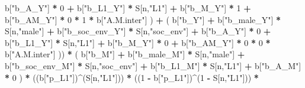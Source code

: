 \documentclass[
]{book}
\newenvironment{Shaded}{\begin{snugshade}}{\end{snugshade}}
\newcommand{\DecValTok}[1]{\textcolor[rgb]{0.00,0.00,0.81}{#1}}
\newcommand{\NormalTok}[1]{#1}
\newcommand{\SpecialCharTok}[1]{\textcolor[rgb]{0.81,0.36,0.00}{\textbf{#1}}}
\newcommand{\StringTok}[1]{\textcolor[rgb]{0.31,0.60,0.02}{#1}}
\begin{document}
\begin{Shaded}
\begin{Highlighting}[]
\NormalTok{                                 b[}\StringTok{"b\_A\_Y"}\NormalTok{] }\SpecialCharTok{*} \DecValTok{0} \SpecialCharTok{+} 
\NormalTok{                                 b[}\StringTok{"b\_L1\_Y"}\NormalTok{] }\SpecialCharTok{*}\NormalTok{ S[n,}\StringTok{"L1"}\NormalTok{] }\SpecialCharTok{+}
\NormalTok{                                 b[}\StringTok{"b\_M\_Y"}\NormalTok{] }\SpecialCharTok{*} \DecValTok{1} \SpecialCharTok{+}
\NormalTok{                                 b[}\StringTok{"b\_AM\_Y"}\NormalTok{] }\SpecialCharTok{*} \DecValTok{0} \SpecialCharTok{*} \DecValTok{1} \SpecialCharTok{*}\NormalTok{ b[}\StringTok{"A.M.inter"}\NormalTok{] ) }\SpecialCharTok{+} 
\NormalTok{                             ( b[}\StringTok{"b\_Y"}\NormalTok{] }\SpecialCharTok{+} 
\NormalTok{                                 b[}\StringTok{"b\_male\_Y"}\NormalTok{] }\SpecialCharTok{*}\NormalTok{ S[n,}\StringTok{"male"}\NormalTok{] }\SpecialCharTok{+} 
\NormalTok{                                 b[}\StringTok{"b\_soc\_env\_Y"}\NormalTok{] }\SpecialCharTok{*}\NormalTok{ S[n,}\StringTok{"soc\_env"}\NormalTok{] }\SpecialCharTok{+} 
\NormalTok{                                 b[}\StringTok{"b\_A\_Y"}\NormalTok{] }\SpecialCharTok{*} \DecValTok{0} \SpecialCharTok{+} 
\NormalTok{                                 b[}\StringTok{"b\_L1\_Y"}\NormalTok{] }\SpecialCharTok{*}\NormalTok{ S[n,}\StringTok{"L1"}\NormalTok{] }\SpecialCharTok{+}
\NormalTok{                                 b[}\StringTok{"b\_M\_Y"}\NormalTok{] }\SpecialCharTok{*} \DecValTok{0} \SpecialCharTok{+}
\NormalTok{                                 b[}\StringTok{"b\_AM\_Y"}\NormalTok{] }\SpecialCharTok{*} \DecValTok{0} \SpecialCharTok{*} \DecValTok{0} \SpecialCharTok{*}\NormalTok{ b[}\StringTok{"A.M.inter"}\NormalTok{] )) }\SpecialCharTok{*}
\NormalTok{      ( b[}\StringTok{"b\_M"}\NormalTok{] }\SpecialCharTok{+} 
\NormalTok{          b[}\StringTok{"b\_male\_M"}\NormalTok{] }\SpecialCharTok{*}\NormalTok{ S[n,}\StringTok{"male"}\NormalTok{] }\SpecialCharTok{+} 
\NormalTok{          b[}\StringTok{"b\_soc\_env\_M"}\NormalTok{] }\SpecialCharTok{*}\NormalTok{ S[n,}\StringTok{"soc\_env"}\NormalTok{] }\SpecialCharTok{+} 
\NormalTok{          b[}\StringTok{"b\_L1\_M"}\NormalTok{] }\SpecialCharTok{*}\NormalTok{ S[n,}\StringTok{"L1"}\NormalTok{] }\SpecialCharTok{+}
\NormalTok{          b[}\StringTok{"b\_A\_M"}\NormalTok{] }\SpecialCharTok{*} \DecValTok{0}\NormalTok{ ) }\SpecialCharTok{*} 
\NormalTok{      ((b[}\StringTok{"p\_L1"}\NormalTok{])}\SpecialCharTok{\^{}}\NormalTok{(S[n,}\StringTok{"L1"}\NormalTok{])) }\SpecialCharTok{*}
\NormalTok{      ((}\DecValTok{1} \SpecialCharTok{{-}}\NormalTok{ b[}\StringTok{"p\_L1"}\NormalTok{])}\SpecialCharTok{\^{}}\NormalTok{(}\DecValTok{1} \SpecialCharTok{{-}}\NormalTok{ S[n,}\StringTok{"L1"}\NormalTok{])) }\SpecialCharTok{*}

\end{Highlighting}
\end{Shaded}
\end{document}

